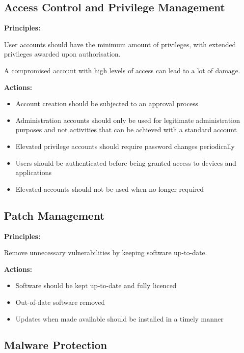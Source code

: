 \documentclass{article}
\begin{document}
\subsection{Access Control and Privilege Management}

\textbf{Principles:}

User accounts should have the minimum amount of privileges, with extended privileges awarded upon authorisation.

A compromised account with high levels of access can lead to a lot of damage.

\textbf{Actions:}

\begin{itemize}
\item 
  Account creation should be subjected to an approval process
\item 
  Administration accounts should only be used for legitimate administration purposes and \underline{not} activities that can be achieved with a standard account
\item 
  Elevated privilege accounts should require password changes periodically
\item 
  Users should be authenticated before being granted access to devices and applications
\item 
  Elevated accounts should not be used when no longer required
\end{itemize}

\subsection{Patch Management}

\textbf{Principles:}

Remove unnecessary vulnerabilities by keeping software up-to-date.

\textbf{Actions:}

\begin{itemize}
\item 
  Software should be kept up-to-date and fully licenced
\item 
  Out-of-date software removed
\item 
  Updates when made available should be installed in a timely manner
\end{itemize}

\subsection{Malware Protection}
\end{document}
